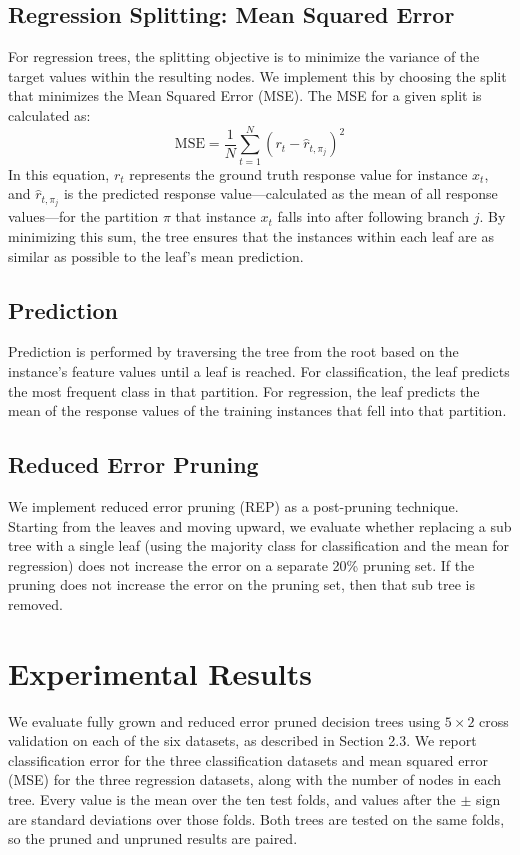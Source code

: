 \documentclass[twoside,11pt]{article}
\begin{document}
\subsection{Regression Splitting: Mean Squared Error}
For regression trees, the splitting objective is to minimize the variance of the target values within the resulting nodes. We implement this by choosing the split that minimizes the Mean Squared Error (MSE). The MSE for a given split is calculated as:
\begin{equation}
\text{MSE} = \frac{1}{N} \sum_{t=1}^{N} (r_t - \hat{r}_{t,\pi_j})^2
\end{equation}
In this equation, $r_t$ represents the ground truth response value for instance $x_t$, and $\hat{r}_{t,\pi_j}$ is the predicted response value—calculated as the mean of all response values—for the partition $\pi$ that instance $x_t$ falls into after following branch $j$. By minimizing this sum, the tree ensures that the instances within each leaf are as similar as possible to the leaf's mean prediction.

\subsection{Prediction}
Prediction is performed by traversing the tree from the root based on the instance's feature values until a leaf is reached. For classification, the leaf predicts the most frequent class in that partition. For regression, the leaf predicts the mean of the response values of the training instances that fell into that partition.  

\subsection{Reduced Error Pruning}
We implement reduced error pruning (REP) \citep{quinlan1987} as a post-pruning technique. Starting from the leaves and moving upward, we evaluate whether replacing a sub tree with a single leaf (using the majority class for classification and the mean for regression) does not increase the error on a separate 20\% pruning set. If the pruning does not increase the error on the pruning set, then that sub tree is removed. 


\section{Experimental Results}
We evaluate fully grown and reduced error pruned decision trees using $5 \times 2$ cross validation on each of the six datasets, as described in Section 2.3. We report classification error for the three classification datasets and mean squared error (MSE) for the three regression datasets, along with the number of nodes in each tree. Every value is the mean over the ten test folds, and values after the $\pm$ sign are standard deviations over those folds. Both trees are tested on the same folds, so the pruned and unpruned results are paired.
\end{document}
